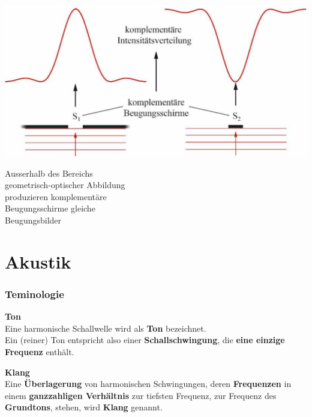 \begin{minipage}{0.48\linewidth}
\includegraphics[width=0.98\linewidth]{Bilder/Wellen-Optik/babinet_prinzip} \\
\end{minipage}
\hfill
\begin{minipage}{0.48\linewidth}

Ausserhalb des Bereichs \\
geometrisch-optischer Abbildung\\
produzieren komplementäre\\
Beugungsschirme gleiche \\
Beugungsbilder
\end{minipage}





\section{Akustik}

\subsubsection{Teminologie}

\textbf{Ton}\\
Eine harmonische Schallwelle wird als \textbf{Ton} bezeichnet. \\
Ein (reiner) Ton entspricht also einer \textbf{Schallschwingung}, die \textbf{eine
einzige Frequenz} enthält. \\
\vspace{0.2cm}

\textbf{Klang} \\
Eine \textbf{Überlagerung} von harmonischen Schwingungen, deren
\textbf{Frequenzen} in einem \textbf{ganzzahligen Verhältnis} zur tiefsten
Frequenz, zur Frequenz des \textbf{Grundtons}, stehen, wird \textbf{Klang}
genannt. \\
\vspace{0.2cm}

